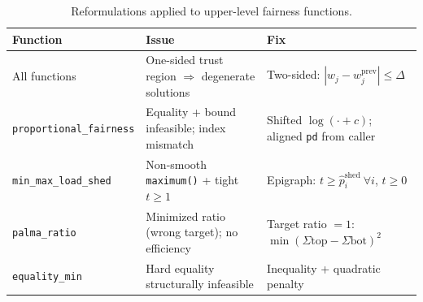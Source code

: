 \documentclass[11pt]{article}
\begin{document}
\begin{table}[h]
\centering
\small
\begin{tabular}{@{}lll@{}}
\toprule
\textbf{Function} & \textbf{Issue} & \textbf{Fix} \\
\midrule
All functions & One-sided trust region $\Rightarrow$ degenerate solutions & Two-sided: $|w_j - w_j^{\mathrm{prev}}| \le \Delta$ \\
\texttt{proportional\_fairness} & Equality + bound infeasible; index mismatch & Shifted $\log(\cdot + c)$; aligned \texttt{pd} from caller \\
\texttt{min\_max\_load\_shed} & Non-smooth \texttt{maximum()} + tight $t\ge1$ & Epigraph: $t \ge \hat{p}_i^{\mathrm{shed}}\ \forall i$, $t \ge 0$ \\
\texttt{palma\_ratio} & Minimized ratio (wrong target); no efficiency & Target ratio $= 1$: $\min(\Sigma\mathrm{top} - \Sigma\mathrm{bot})^2$ \\
\texttt{equality\_min} & Hard equality structurally infeasible & Inequality + quadratic penalty \\
\bottomrule
\end{tabular}
\caption{Reformulations applied to upper-level fairness functions.}
\end{table}
\end{document}

